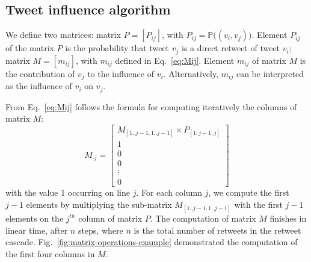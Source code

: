 

\subsection{Tweet influence algorithm}

We define two matrices:
matrix $P = [ P_{ij} ]$, with $P_{ij} = \mathds{P}\big((v_i, v_j)\big)$.
Element $P_{ij}$ of the matrix $P$ is the probability that tweet $v_j$ is a direct retweet of tweet $v_i$;
matrix $M = [ m_{ij} ]$, with $m_{ij}$ defined in Eq.~\eqref{eq:Mij}.
Element $m_{ij}$ of matrix $M$ is the contribution of $v_j$ to the influence of $v_i$.
Alternatively, $m_{ij}$ can be interpreted as the influence of $v_i$ on $v_j$.

From Eq.~\eqref{eq:Mij} follows the formula for computing iteratively the columns of matrix $M$:
\begin{equation} \label{eq:Mij-matrix}
M_{ \cdot j}=
\left[
\begin{array}{c}
M_{[1..j-1, 1..j-1]} \times P_{[1:j-1,j]} \\
1 \\
0 \\
0 \\
\vdots \\
0 
\end{array}
\right]
\end{equation}
with the value 1 occurring on line $j$.
For each column $j$, we compute the first $j-1$ elements by multiplying the sub-matrix $M_{[1..j-1, 1..j-1]}$ with the first $j-1$ elements on the $j^{th}$ column of matrix $P$.
The computation of matrix $M$ finishes in linear time, after $n$ steps, where $n$ is the total number of retweets in the retweet cascade.
Fig.~\ref{fig:matrix-operations-example} demonstrated the computation of the first four columns in $M$.
